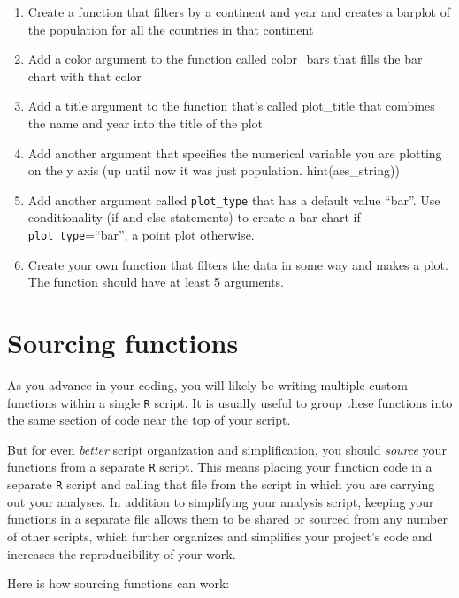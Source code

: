 \documentclass[
]{book}
\begin{document}
\begin{enumerate}
\def\labelenumi{\arabic{enumi})}
\item
  Create a function that filters by a continent and year and creates a barplot of the population for all the countries in that continent
\item
  Add a color argument to the function called color\_bars that fills the bar chart with that color
\item
  Add a title argument to the function that's called plot\_title that combines the name and year into the title of the plot
\item
  Add another argument that specifies the numerical variable you are plotting on the y axis (up until now it was just population. hint(aes\_string))
\item
  Add another argument called \texttt{plot\_type} that has a default value ``bar''. Use conditionality (if and else statements) to create a bar chart if \texttt{plot\_type}=``bar'', a point plot otherwise.
\item
  Create your own function that filters the data in some way and makes a plot. The function should have at least 5 arguments.
\end{enumerate}

\hypertarget{sourcing-functions}{%
\section*{Sourcing functions}\label{sourcing-functions}}

As you advance in your coding, you will likely be writing multiple custom functions within a single \texttt{R} script. It is usually useful to group these functions into the same section of code near the top of your script.

But for even \emph{better} script organization and simplification, you should \emph{source} your functions from a separate \texttt{R} script. This means placing your function code in a separate \texttt{R} script and calling that file from the script in which you are carrying out your analyses. In addition to simplifying your analysis script, keeping your functions in a separate file allows them to be shared or sourced from any number of other scripts, which further organizes and simplifies your project's code and increases the reproducibility of your work.

Here is how sourcing functions can work:
\end{document}
